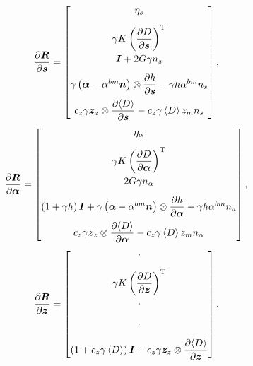 \begin{gather}
\dfrac{\partial{\bm{R}}}{\partial{\bm{s}}}=
\begin{bmatrix}
	\eta_s                                                                                                              \\[3mm]
	\gamma{}K\left(\dfrac{\partial{D}}{\partial{\bm{s}}}\right)^{\mathrm{T}}                                                                                            \\[3mm]
	\bm{I}+2G\gamma{}n_s                                                                                            \\[3mm]
	\gamma\left(\bm{\alpha}-\alpha^{bm}\bm{n}\right)\otimes\dfrac{\partial{h}}{\partial{\bm{s}}}-\gamma{}h\alpha^{bm}n_s                           \\[3mm]
	c_z\gamma{}\bm{z}_z\otimes\dfrac{\partial{\left\langle{}D\right\rangle}}{\partial{\bm{s}}}-c_z\gamma{}\left\langle{}D\right\rangle{}z_mn_s
\end{bmatrix},
\end{gather}
\begin{gather}
\dfrac{\partial{\bm{R}}}{\partial{\bm{\alpha}}}=
\begin{bmatrix}
	\eta_\alpha                                                                                                                      \\[3mm]
	\gamma{}K\left(\dfrac{\partial{D}}{\partial{\bm{\alpha}}}\right)^{\mathrm{T}}                                                                                                     \\[3mm]
	2G\gamma{}n_\alpha                                                                                                               \\[3mm]
	\left(1+\gamma{}h\right)\bm{I}+\gamma\left(\bm{\alpha}-\alpha^{bm}\bm{n}\right)\otimes\dfrac{\partial{h}}{\partial{\bm{\alpha}}}-\gamma{}h\alpha^{bm}n_a \\[3mm]
	c_z\gamma{}\bm{z}_z\otimes\dfrac{\partial{\left\langle{}D\right\rangle}}{\partial{\bm{\alpha}}}-c_z\gamma{}\left\langle{}D\right\rangle{}z_mn_\alpha
\end{bmatrix},
\end{gather}
\begin{gather}
\dfrac{\partial{\bm{R}}}{\partial{\bm{z}}}=
\begin{bmatrix}
	\cdot                                                                                                                             \\[3mm]
	\gamma{}K\left(\dfrac{\partial{D}}{\partial{\bm{z}}}\right)^{\mathrm{T}}                                                                                                       \\[3mm]
	\cdot                                                                                                                             \\[3mm]
	\cdot                                                                                                                             \\[3mm]
	\left(1+c_z\gamma{}\left\langle{}D\right\rangle\right)\bm{I}+c_z\gamma{}\bm{z}_z\otimes\dfrac{\partial{\left\langle{}D\right\rangle}}{\partial{\bm{z}}}
\end{bmatrix}.
\end{gather}

